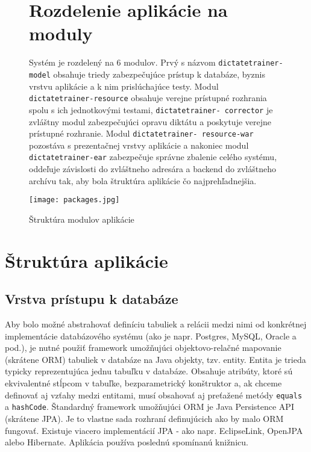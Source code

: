 \documentclass[12pt,oneside]{fithesis2}
\begin{document}
			\begin{figure}
	   	\section{Rozdelenie aplikácie na moduly}
      	\par Systém je rozdelený na 6 modulov. Prvý s názvom \texttt{dictatetrainer-model} obsahuje triedy zabezpečujúce prístup k databáze, byznis vrstvu aplikácie a k nim prislúchajúce testy. Modul \texttt{dictatetrainer-resource} obsahuje verejne prístupné rozhrania spolu s ich jednotkovými testami, \texttt{dictatetrainer- corrector} je zvláštny modul zabezpečujúci opravu diktátu a poskytuje verejne prístupné rozhranie. Modul 
      	\texttt{dictatetrainer- resource-war} pozostáva s prezentačnej vrstvy aplikácie a nakoniec modul \texttt{dictatetrainer-ear} zabezpečuje správne zbalenie celého systému, oddeľuje závislosti do zvláštneho adresára a backend do zvláštneho archívu tak, aby bola štruktúra aplikácie čo najprehľadnejšia.
      	
\bigskip
      	\texttt{[image: packages.jpg]}
	\caption{Štruktúra modulov aplikácie}
	\label{packagediag}
	\end{figure}
	
	\pagebreak
	
    \section{Štruktúra aplikácie} \label{app-layers}
          \subsection{Vrstva prístupu k databáze}
      
      \par Aby bolo možné abstrahovať definíciu tabuliek a relácii medzi nimi od konkrétnej implementácie databázového systému (ako je napr. Postgres, MySQL, Oracle a pod.), je nutné použiť framework umožňujúci objektovo-relačné mapovanie (skrátene ORM) tabuliek v databáze na Java objekty, tzv. entity. Entita je trieda typicky reprezentujúca jednu tabuľku v databáze. Obsahuje atribúty, ktoré sú ekvivalentné stĺpcom v tabuľke, bezparametrický konštruktor a, ak chceme definovať aj vzťahy medzi entitami, musí obsahovať aj preťažené metódy \texttt{equals} a \texttt{hashCode}. Štandardný framework umožňujúci ORM je Java Persistence API (skrátene JPA). Je to vlastne sada rozhraní definujúcich ako by malo ORM fungovať. Existuje viacero implementácií JPA - ako napr. EclipseLink, OpenJPA alebo Hibernate. Aplikácia používa poslednú spomínanú knižnicu.
\end{document}
